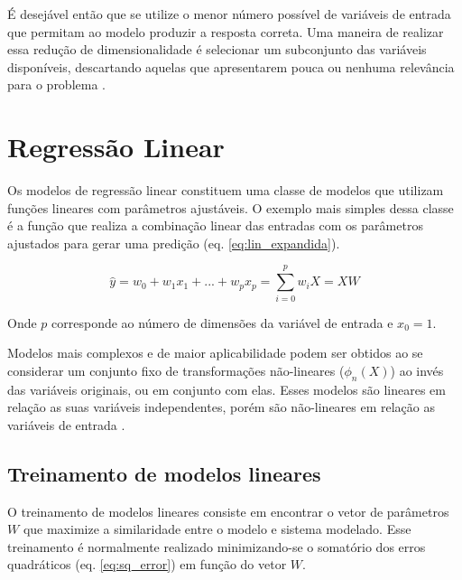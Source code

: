 É desejável então que se utilize o menor número possível de variáveis de entrada que permitam ao modelo produzir a resposta correta. Uma maneira de realizar essa redução de dimensionalidade é selecionar um subconjunto das variáveis disponíveis, descartando aquelas que apresentarem pouca ou nenhuma relevância para o problema \cite[p. 204]{intro_stat_learn}.


\section{Regressão Linear}

Os modelos de regressão linear constituem uma classe de modelos que utilizam funções lineares com parâmetros ajustáveis. O exemplo mais simples dessa classe é a função que realiza a combinação linear das entradas com os parâmetros ajustados para gerar uma predição (eq. \ref{eq:lin_expandida}).

\begin{equation}
    \hat{y} = w_0 + w_1x_1+ ... + w_px_p = \sum_{i = 0}^{p} w_iX = XW
    \label{eq:lin_expandida}
\end{equation}

Onde $p$ corresponde ao número de dimensões da variável de entrada e $x_0 = 1$.

Modelos mais complexos e de maior aplicabilidade podem ser obtidos ao se considerar um conjunto fixo de 
transformações não-lineares ($\phi_n(X)$) ao invés das variáveis originais, ou em conjunto com elas. 
Esses modelos são lineares em relação as suas variáveis independentes, porém são não-lineares em relação 
as variáveis de entrada \cite{bishop_2006}.

\subsection{Treinamento de modelos lineares}

O treinamento de modelos lineares consiste em encontrar o vetor de parâmetros $W$ que maximize a similaridade entre o modelo e sistema modelado. Esse treinamento é normalmente realizado minimizando-se o somatório dos erros quadráticos (eq. \ref{eq:sq_error}) em função do vetor $W$.


